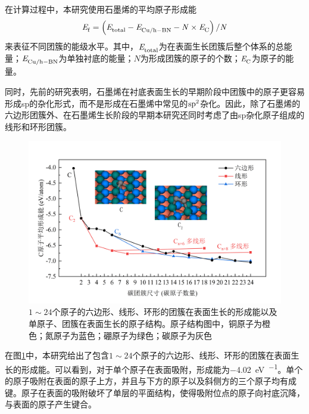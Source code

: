     在计算过程中，本研究使用石墨烯的平均原子形成能
    $$\it E_{\rm f}^{\rm } \it=\left(\it E_{\rm total}^{\rm } \it-\it E_{\rm Cu/h-BN}^{\rm } \it-N\times \it E_{\rm C}^{\rm } \it\right)\slash N$$
    来表征不同团簇的能级水平。其中，$\it E_{\rm total}^{\rm } \it$为在表面生长团簇后整个体系的总能量；$\it E_{\rm Cu/h-BN}^{\rm } \it$为单独衬底的能量；$N$为形成团簇的原子的个数；$\it E_{\rm C}^{\rm } \it$为原子的能量。

    同时，先前的研究表明，石墨烯在衬底表面生长的早期阶段中团簇中的原子更容易形成sp的杂化形式，而不是形成在石墨烯中常见的$\rm sp^2$杂化。因此，除了石墨烯的六边形团簇外、在石墨烯生长阶段的早期本研究还同时考虑了由sp杂化原子组成的线形和环形团簇。

    \begin{figure}[htb]
        \includegraphics{pic/CG_DFT_C_cluster_onBN.png}
        \caption{$1 \sim 24$个原子的六边形、线形、环形的团簇在表面生长的形成能以及单原子、团簇在表面生长的原子结构。原子结构图中，铜原子为橙色；氮原子为蓝色；硼原子为绿色；碳原子为灰色}
        \label{fig:CG_DFT_C_cluster_onBN}
    \end{figure}

    在图\ref{fig:CG_DFT_C_cluster_onBN}中，本研究给出了包含$1 \sim 24$个原子的六边形、线形、环形的团簇在表面生长的形成能。可以看到，对于单个原子在表面吸附，形成能为\SI{-4.02}{\electronvolt\per\atom}。单个的原子吸附在表面的原子上方，并且与下方的原子以及斜侧方的三个原子均有成键。原子在表面的吸附破坏了单层的平面结构，使得吸附位点的原子向衬底沉降，与表面的原子产生键合。

